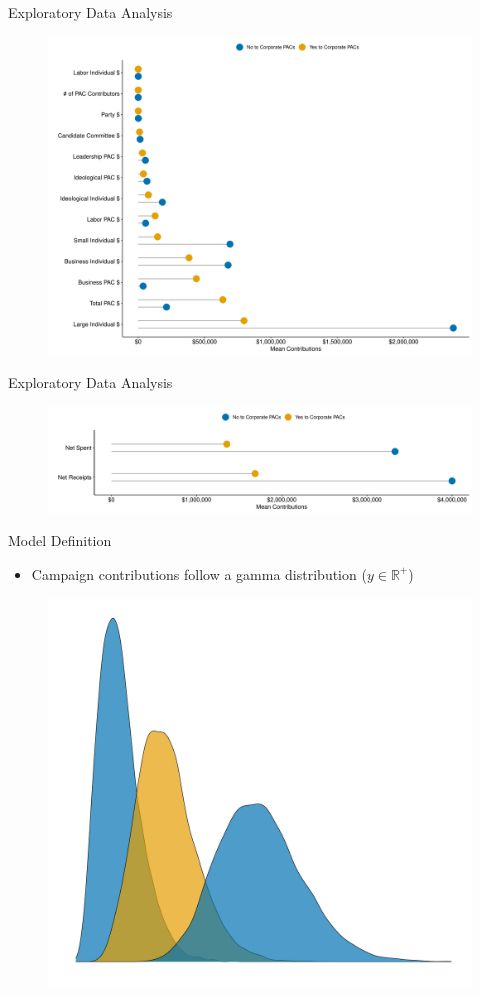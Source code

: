 \documentclass[12pt, aspectratio=169]{beamer}
\begin{document}
\begin{frame}{Exploratory Data Analysis}

\begin{figure}[!htb]
    \centering
    \includegraphics[width=0.65\linewidth]{all_candy.pdf}

\end{figure}

\end{frame}


\begin{frame}{Exploratory Data Analysis}

\begin{figure}[ht]
    \centering
    \includegraphics[width=1\linewidth]{spending_candy.pdf}
\end{figure}

\end{frame}


\begin{frame}{Model Definition}

\begin{itemize}
	\item Campaign contributions follow a gamma distribution ($y \in  \mathbb{R}^+$)
\end{itemize}

\begin{figure}[!htb]
    \centering
    \includegraphics[width=0.5\linewidth]{gamma.pdf}
\end{figure}

\end{frame}
\end{document}
